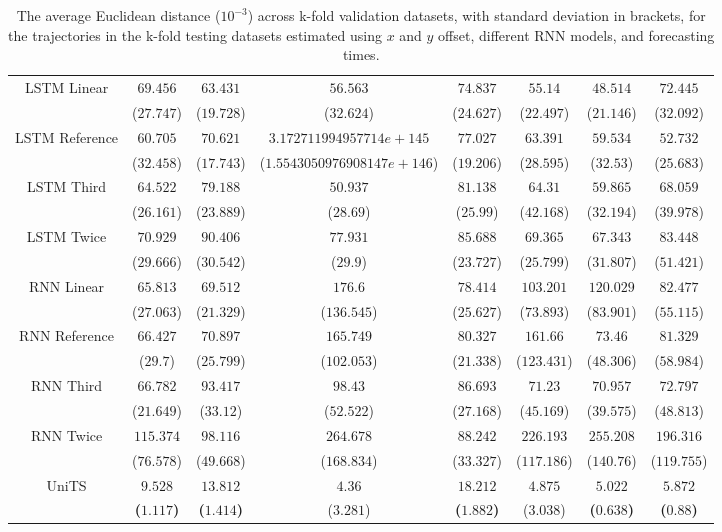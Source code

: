 \begin{table}[!ht]
{\begin{tabular}{|c|c|c|c|c|c|c|c|}
			\multirow{2}{*}{LSTM Linear} & $69.456$ & $63.431$ & $56.563$ & $74.837$ & $55.14$ & $48.514$ & $72.445$ \\
			 & ($27.747$) & ($19.728$) & ($32.624$) & ($24.627$) & ($22.497$) & ($21.146$) & ($32.092$) \\ \hline
			\multirow{2}{*}{LSTM Reference} & $60.705$ & $70.621$ & $3.172711994957714e+145$ & $77.027$ & $63.391$ & $59.534$ & $52.732$ \\
			 & ($32.458$) & ($17.743$) & ($1.5543050976908147e+146$) & ($19.206$) & ($28.595$) & ($32.53$) & ($25.683$) \\ \hline
			\multirow{2}{*}{LSTM Third} & $64.522$ & $79.188$ & $50.937$ & $81.138$ & $64.31$ & $59.865$ & $68.059$ \\
			 & ($26.161$) & ($23.889$) & ($28.69$) & ($25.99$) & ($42.168$) & ($32.194$) & ($39.978$) \\ \hline
			\multirow{2}{*}{LSTM Twice} & $70.929$ & $90.406$ & $77.931$ & $85.688$ & $69.365$ & $67.343$ & $83.448$ \\
			 & ($29.666$) & ($30.542$) & ($29.9$) & ($23.727$) & ($25.799$) & ($31.807$) & ($51.421$) \\ \hline
			\multirow{2}{*}{RNN Linear} & $65.813$ & $69.512$ & $176.6$ & $78.414$ & $103.201$ & $120.029$ & $82.477$ \\
			 & ($27.063$) & ($21.329$) & ($136.545$) & ($25.627$) & ($73.893$) & ($83.901$) & ($55.115$) \\ \hline
			\multirow{2}{*}{RNN Reference} & $66.427$ & $70.897$ & $165.749$ & $80.327$ & $161.66$ & $73.46$ & $81.329$ \\
			 & ($29.7$) & ($25.799$) & ($102.053$) & ($21.338$) & ($123.431$) & ($48.306$) & ($58.984$) \\ \hline
			\multirow{2}{*}{RNN Third} & $66.782$ & $93.417$ & $98.43$ & $86.693$ & $71.23$ & $70.957$ & $72.797$ \\
			 & ($21.649$) & ($33.12$) & ($52.522$) & ($27.168$) & ($45.169$) & ($39.575$) & ($48.813$) \\ \hline
			\multirow{2}{*}{RNN Twice} & $115.374$ & $98.116$ & $264.678$ & $88.242$ & $226.193$ & $255.208$ & $196.316$ \\
			 & ($76.578$) & ($49.668$) & ($168.834$) & ($33.327$) & ($117.186$) & ($140.76$) & ($119.755$) \\ \hline
			\multirow{2}{*}{UniTS} & $\mathbf{9.528}$ & $\mathbf{13.812}$ & $4.36$ & $\mathbf{18.212}$ & $4.875$ & $\mathbf{5.022}$ & $\mathbf{5.872}$ \\
			 & \textbf{(}$\mathbf{1.117}$\textbf{)} & \textbf{(}$\mathbf{1.414}$\textbf{)} & ($3.281$) & \textbf{(}$\mathbf{1.882}$\textbf{)} & ($3.038$) & \textbf{(}$\mathbf{0.638}$\textbf{)} & \textbf{(}$\mathbf{0.88}$\textbf{)} \\ \hline
		\end{tabular}
	}
	\caption{The average Euclidean distance ($10^{-3}$) across k-fold validation datasets, with standard deviation in brackets, for the trajectories in the k-fold testing datasets estimated using $x$ and $y$ offset, different RNN models, and forecasting times.}
	\label{tab:all_no_abs_euclid}
\end{table}